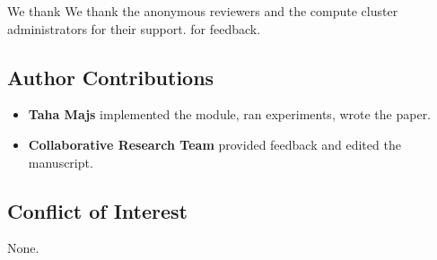 We thank We thank the anonymous reviewers and the compute cluster administrators for their support. for feedback.

\subsection{Author Contributions}

\begin{itemize}
\item \textbf{Taha Majs} implemented the module, ran experiments, wrote the paper.
\item \textbf{Collaborative Research Team} provided feedback and edited the manuscript.

\end{itemize}
\subsection{Conflict of Interest}

None.


